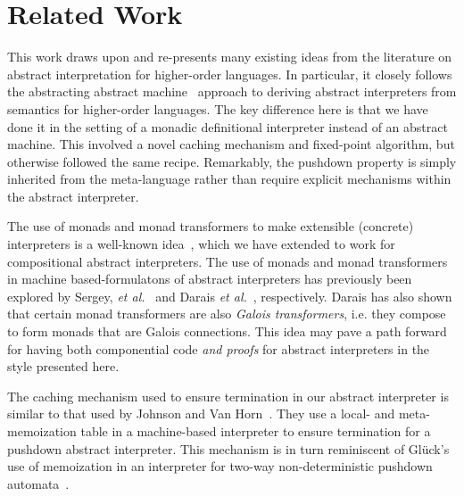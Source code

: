 \section{Related Work}

This work draws upon and re-presents many existing ideas from the literature on
abstract interpretation for higher-order languages.  In particular, it closely
follows the abstracting abstract
machine~\cite{dvanhorn:VanHorn2010Abstracting,dvanhorn:VanHorn2012Systematic}
approach to deriving abstract interpreters from semantics for higher-order
languages.  The key difference here is that we have done it in the setting of a
monadic definitional interpreter instead of an abstract machine.  This involved
a novel caching mechanism and fixed-point algorithm, but otherwise followed the
same recipe.  Remarkably, the pushdown property is simply inherited from the
meta-language rather than require explicit mechanisms within the abstract
interpreter.

The use of monads and monad transformers to make extensible (concrete)
interpreters is a well-known
idea~\cite{davdar:Moggi:1989:Monads,local:steele-popl94,dvanhorn:Liang1995Monad},
which we have extended to work for compositional abstract interpreters.  The
use of monads and monad transformers in machine based-formulatons of abstract
interpreters has previously been explored by Sergey, \emph{et
al.}~\cite{dvanhorn:Sergey2013Monadic} and Darais \emph{et
al.}~\cite{local:darais-oopsla2015}, respectively.  Darais has also shown that
certain monad transformers are also \emph{Galois transformers}, i.e. they
compose to form monads that are Galois connections.  This idea may pave a path
forward for having both componential code \emph{and proofs} for abstract
interpreters in the style presented here.

The caching mechanism used to ensure termination in our abstract interpreter is
similar to that used by Johnson and Van
Horn~\cite{dvanhorn:Johnson2014Abstracting}.  They use a local- and
meta-memoization table in a machine-based interpreter to ensure termination for
a pushdown abstract interpreter.  This mechanism is in turn reminiscent of
Glück's use of memoization in an interpreter for two-way non-deterministic
pushdown automata~\cite{local:gluck-schmidtfest13}.


